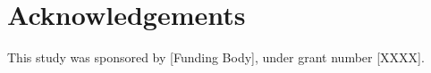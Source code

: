 \chapter*{Acknowledgements}

This study was sponsored by [Funding Body], under grant number [XXXX].

\lipsum[3]
